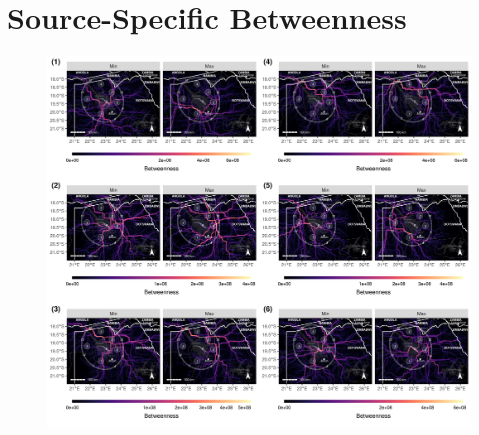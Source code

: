 \documentclass[abstract=on,10pt,a4paper,bibliography=totocnumbered]{article}
\begin{document}
\newpage
\section{Source-Specific Betweenness}
\begin{figure}[htbp]
  \begin{center}
  \includegraphics[width = \textwidth]{99_BetweennessIndividual.png}
  \caption{}
  \label{Betweenness}
  \end{center}
\end{figure}

\newpage
\end{document}
